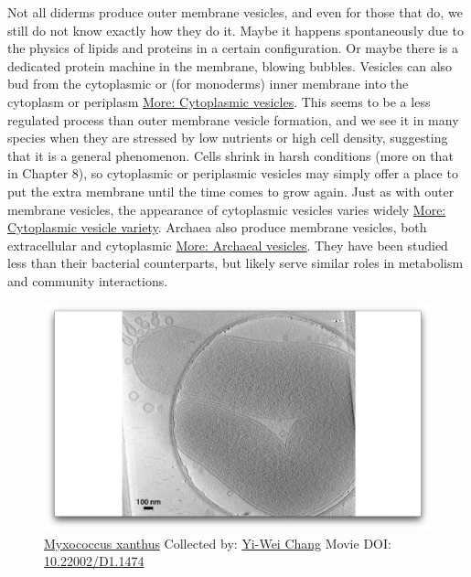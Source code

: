\documentclass[]{tufte-book}
\begin{document}
Not all diderms produce outer membrane vesicles, and even for those that
do, we still do not know exactly how they do it. Maybe it happens
spontaneously due to the physics of lipids and proteins in a certain
configuration. Or maybe there is a dedicated protein machine in the
membrane, blowing bubbles. Vesicles can also bud from the cytoplasmic or
(for monoderms) inner membrane into the cytoplasm or periplasm
\protect\hyperlink{Cytoplasmic_vesicles}{More: Cytoplasmic vesicles}.
This seems to be a less regulated process than outer membrane vesicle
formation, and we see it in many species when they are stressed by low
nutrients or high cell density, suggesting that it is a general
phenomenon. Cells shrink in harsh conditions (more on that in Chapter
8), so cytoplasmic or periplasmic vesicles may simply offer a place to
put the extra membrane until the time comes to grow again. Just as with
outer membrane vesicles, the appearance of cytoplasmic vesicles varies
widely \protect\hyperlink{Cytoplasmic_vesicle_variety}{More: Cytoplasmic
vesicle variety}. Archaea also produce membrane vesicles, both
extracellular and cytoplasmic
\protect\hyperlink{Archaeal_vesicles}{More: Archaeal vesicles}. They
have been studied less than their bacterial counterparts, but likely
serve similar roles in metabolism and community interactions.





\begin{figure}
\includegraphics{movie_stills/2_4} \caption[\protect\hyperlink{tree}{Myxococcus xanthus} Collected by:
\protect\hyperlink{yi-wei_chang}{Yi-Wei Chang} Movie DOI:
\href{https://doi.org/10.22002/D1.1474}{10.22002/D1.1474}]{\protect\hyperlink{tree}{Myxococcus xanthus} Collected by:
\protect\hyperlink{yi-wei_chang}{Yi-Wei Chang} Movie DOI:
\href{https://doi.org/10.22002/D1.1474}{10.22002/D1.1474}}\label{fig:2-4}
\end{figure}
\end{document}
